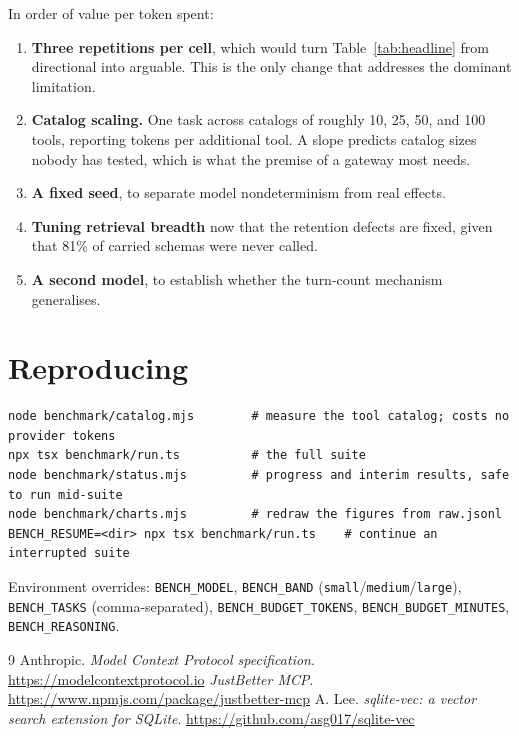 \documentclass[11pt,a4paper]{article}
\begin{document}
In order of value per token spent:

\begin{enumerate}[leftmargin=1.6em, itemsep=0.3em]
  \item \textbf{Three repetitions per cell}, which would turn Table~\ref{tab:headline} from
  directional into arguable. This is the only change that addresses the dominant limitation.
  \item \textbf{Catalog scaling.} One task across catalogs of roughly 10, 25, 50, and 100 tools,
  reporting tokens per additional tool. A slope predicts catalog sizes nobody has tested, which is
  what the premise of a gateway most needs.
  \item \textbf{A fixed seed}, to separate model nondeterminism from real effects.
  \item \textbf{Tuning retrieval breadth} now that the retention defects are fixed, given that 81\%
  of carried schemas were never called.
  \item \textbf{A second model}, to establish whether the turn-count mechanism generalises.
\end{enumerate}

\section{Reproducing}

\begin{verbatim}
node benchmark/catalog.mjs        # measure the tool catalog; costs no provider tokens
npx tsx benchmark/run.ts          # the full suite
node benchmark/status.mjs         # progress and interim results, safe to run mid-suite
node benchmark/charts.mjs         # redraw the figures from raw.jsonl
BENCH_RESUME=<dir> npx tsx benchmark/run.ts    # continue an interrupted suite
\end{verbatim}

\noindent
Environment overrides: \texttt{BENCH\_MODEL}, \texttt{BENCH\_BAND}
(\texttt{small}/\texttt{medium}/\texttt{large}), \texttt{BENCH\_TASKS} (comma-separated),
\texttt{BENCH\_BUDGET\_TOKENS}, \texttt{BENCH\_BUDGET\_MINUTES}, \texttt{BENCH\_REASONING}.

\begin{thebibliography}{9}
 Anthropic. \emph{Model Context Protocol specification}.
\url{https://modelcontextprotocol.io}
 \emph{JustBetter MCP}. \url{https://www.npmjs.com/package/justbetter-mcp}
 A. Lee. \emph{sqlite-vec: a vector search extension for SQLite}.
\url{https://github.com/asg017/sqlite-vec}
\end{thebibliography}
\end{document}
